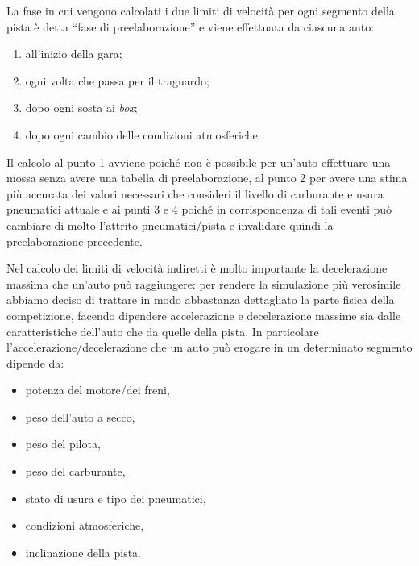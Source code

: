 La fase in cui vengono calcolati i due limiti di velocità per ogni segmento della pista è detta ``fase di preelaborazione'' e viene effettuata da ciascuna auto:
\begin{enumerate}
\item all'inizio della gara;
\item ogni volta che passa per il traguardo;
\item dopo ogni sosta ai \textit{box};
\item dopo ogni cambio delle condizioni atmosferiche.
\end{enumerate}
Il calcolo al punto 1 avviene poiché non è possibile per un'auto effettuare una mossa senza avere una tabella di preelaborazione, al punto 2 per avere una stima più accurata dei valori necessari che consideri il livello di carburante e usura pneumatici attuale e ai punti 3 e 4 poiché in corrispondenza di tali eventi può cambiare di molto l'attrito pneumatici/pista e invalidare quindi la preelaborazione precedente.

Nel calcolo dei limiti di velocità indiretti è molto importante la decelerazione massima che un'auto può raggiungere: per rendere la simulazione più verosimile abbiamo deciso di trattare in modo abbastanza dettagliato la parte fisica della competizione, facendo dipendere accelerazione e decelerazione massime sia dalle caratteristiche dell'auto che da quelle della pista.
In particolare l'accelerazione/decelerazione che un auto può erogare in un determinato segmento dipende da:
\begin{itemize}
\item potenza del motore/dei freni,
\item peso dell'auto a secco,
\item peso del pilota,
\item peso del carburante,
\item stato di usura e tipo dei pneumatici,
\item condizioni atmosferiche,
\item inclinazione della pista.
\end{itemize}


